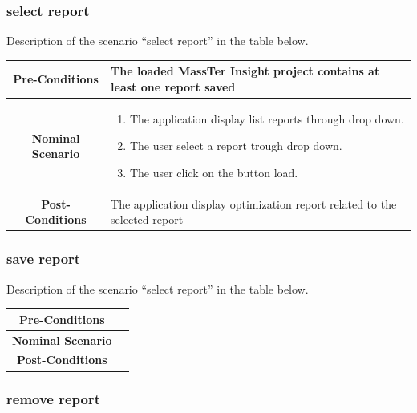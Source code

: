  \clearpage
 \newpage
 
 	 \subsubsection{select report}

 Description of the scenario ``select report'' in the table below.
 
 \begin{table}
 	\centering
 	\begin{tabular}{|c|p{10cm}|}
 		\hline 	
 		\textbf{Pre-Conditions } & The loaded MassTer Insight project contains at least one report saved\\ 
 		\hline                     
 		\textbf{Nominal Scenario } &
 		\begin{enumerate}
 			\item The application display list reports through drop down.
 			\item The user select a report trough drop down.
 			\item The user click on the button load.   
 		\end{enumerate} \\ 
 		\hline 
 		\textbf{Post-Conditions} & The application display optimization report related to the selected report \\
 		\hline 
 	\end{tabular}
 \end{table}
 \clearpage
 \newpage
  	 \subsubsection{save report}
 
 Description of the scenario ``select report'' in the table below.
 
 \begin{table}
 	\centering
 	\begin{tabular}{|c|p{10cm}|}
 		\hline 	
 		\textbf{Pre-Conditions } & \\ 
 		\hline                     
 		\textbf{Nominal Scenario } & \\ 
 		\hline 
 		\textbf{Post-Conditions} &  \\
 		\hline 
 	\end{tabular}
 \end{table}
 \clearpage
 \newpage
   	 \subsubsection{remove report}
 
